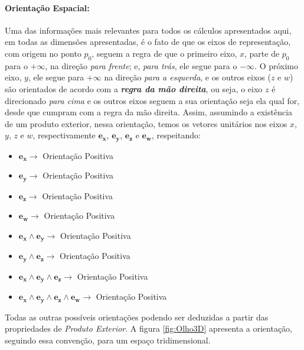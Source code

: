 \documentclass{article}
\begin{document}
	\paragraph{Orientação Espacial:} Uma das informações mais relevantes para todos os cálculos apresentados aqui, em todas as dimensões apresentadas, é o fato de que os eixos de representação, com origem no ponto $p_0$, seguem a regra de que o primeiro eixo, $x$, parte de $p_0$ para o $+\infty$, na direção \textit{para frente}; e, \textit{para trás}, ele segue para o $-\infty$. O próximo eixo, $y$, ele segue para $+\infty$ na direção \textit{para a esquerda}, e os outros eixos ($z$ e $w$) são orientados de acordo com a \textbf{\textit{regra da mão direita}}, ou seja, o eixo $z$ é direcionado \textit{para cima} e os outros eixos seguem a sua orientação seja ela qual for, desde que cumpram com a regra da mão direita. Assim, assumindo a existência de um produto exterior, nessa orientação, temos os vetores unitários nos eixos $x$, $y$, $z$ e $w$, respectivamente $\boldsymbol{e_x}$, $\boldsymbol{e_y}$, $\boldsymbol{e_z}$ e $\boldsymbol{e_w}$, respeitando:
	\begin{itemize}
		\item $\boldsymbol{e_x} \rightarrow$ Orientação Positiva
		\item $\boldsymbol{e_y} \rightarrow$ Orientação Positiva
		\item $\boldsymbol{e_z} \rightarrow$ Orientação Positiva
		\item $\boldsymbol{e_w} \rightarrow$ Orientação Positiva
		\item $\boldsymbol{e_x} \wedge \boldsymbol{e_y} \rightarrow$ Orientação Positiva
		\item $\boldsymbol{e_y} \wedge \boldsymbol{e_z} \rightarrow$ Orientação Positiva
		\item $\boldsymbol{e_x} \wedge \boldsymbol{e_y} \wedge \boldsymbol{e_z} \rightarrow$ Orientação Positiva
		\item $\boldsymbol{e_x} \wedge \boldsymbol{e_y} \wedge \boldsymbol{e_z}  \wedge \boldsymbol{e_w} \rightarrow$ Orientação Positiva
	\end{itemize}
	Todas as outras possíveis orientações podendo ser deduzidas a partir das propriedades de \textit{Produto Exterior}. A figura \ref{fig:Olho3D} apresenta a orientação, seguindo essa convenção, para um espaço tridimensional.
	
\end{document}
